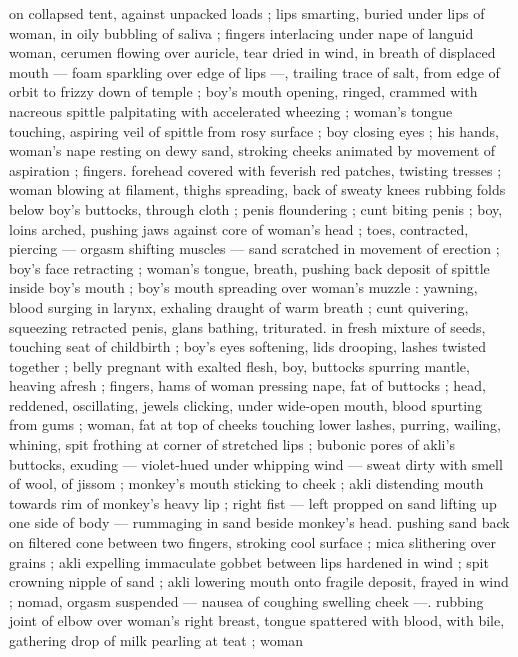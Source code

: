 on collapsed tent, against unpacked loads ; lips smarting, buried
under lips of woman, in oily bubbling of saliva ; fingers interlacing
under nape of languid woman, cerumen flowing over auricle, tear
dried in wind, in breath of displaced mouth --- foam sparkling over
edge of lips ---, trailing trace of salt, from edge of orbit to frizzy
down of temple ; boy’s mouth opening, ringed, crammed with
nacreous spittle palpitating with accelerated wheezing ; woman's
tongue touching, aspiring veil of spittle from rosy surface ; boy
closing eyes ; his hands, woman's nape resting on dewy sand,
stroking cheeks animated by movement of aspiration ; fingers.
forehead covered with feverish red patches, twisting tresses ; woman
blowing at filament, thighs spreading, back of sweaty knees rubbing
folds below boy's buttocks, through cloth ; penis floundering ; cunt
biting penis ; boy, loins arched, pushing jaws against core of
woman's head ; toes, contracted, piercing --- orgasm shifting
muscles --- sand scratched in movement of erection ; boy's face
retracting ; woman's tongue, breath, pushing back deposit of spittle
inside boy's mouth ; boy's mouth spreading over woman's muzzle :
yawning, blood surging in larynx, exhaling draught of warm breath ;
cunt quivering, squeezing retracted penis, glans bathing, triturated.
in fresh mixture of seeds, touching seat of childbirth ; boy's eyes
softening, lids drooping, lashes twisted together ; belly pregnant with
exalted flesh, boy, buttocks spurring mantle, heaving afresh ; fingers,
hams of woman pressing nape, fat of buttocks ; head, reddened,
oscillating, jewels clicking, under wide-open mouth, blood spurting
from gums ; woman, fat at top of cheeks touching lower lashes,
purring, wailing, whining, spit frothing at corner of stretched lips ;
bubonic pores of akli's buttocks, exuding --- violet-hued under
whipping wind --- sweat dirty with smell of wool, of jissom ;
monkey's mouth sticking to cheek ; akli distending mouth towards
rim of monkey's heavy lip ; right fist --- left propped on sand lifting
up one side of body --- rummaging in sand beside monkey's head.
pushing sand back on filtered cone between two fingers, stroking
cool surface ; mica slithering over grains ; akli expelling immaculate
gobbet between lips hardened in wind ; spit crowning nipple of sand
; akli lowering mouth onto fragile deposit, frayed in wind ; nomad,
orgasm suspended --- nausea of coughing swelling cheek ---.
rubbing joint of elbow over woman's right breast, tongue spattered
with blood, with bile, gathering drop of milk pearling at teat ; woman
